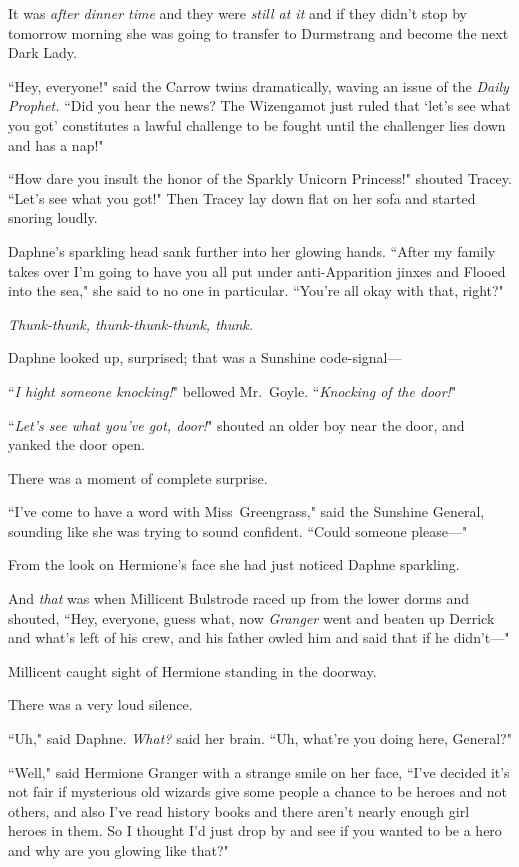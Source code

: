 It was \emph{after dinner time} and they were \emph{still at it} and if they didn't stop by tomorrow morning she was going to transfer to Durmstrang and become the next Dark Lady.

``Hey, everyone!" said the Carrow twins dramatically, waving an issue of the \emph{Daily Prophet.} ``Did you hear the news? The Wizengamot just ruled that `let's see what you got' constitutes a lawful challenge to be fought until the challenger lies down and has a nap!"

``How dare you insult the honor of the Sparkly Unicorn Princess!" shouted Tracey. ``Let's see what you got!" Then Tracey lay down flat on her sofa and started snoring loudly.

Daphne's sparkling head sank further into her glowing hands. ``After my family takes over I'm going to have you all put under anti-Apparition jinxes and Flooed into the sea," she said to no one in particular. ``You're all okay with that, right?"

\emph{Thunk-thunk, thunk-thunk-thunk, thunk.}

Daphne looked up, surprised; that was a Sunshine code-signal---

``\emph{I hight someone knocking!}" bellowed Mr.~Goyle. ``\emph{Knocking of the door!}"

``\emph{Let's see what you've got, door!}" shouted an older boy near the door, and yanked the door open.

There was a moment of complete surprise.

``I've come to have a word with Miss~Greengrass," said the Sunshine General, sounding like she was trying to sound confident. ``Could someone please---"

From the look on Hermione's face she had just noticed Daphne sparkling.

And \emph{that} was when Millicent Bulstrode raced up from the lower dorms and shouted, ``Hey, everyone, guess what, now \emph{Granger} went and beaten up Derrick and what's left of his crew, and his father owled him and said that if he didn't---"

Millicent caught sight of Hermione standing in the doorway.

There was a very loud silence.

``Uh," said Daphne. \emph{What?} said her brain. ``Uh, what're you doing here, General?"

``Well," said Hermione Granger with a strange smile on her face, ``I've decided it's not fair if mysterious old wizards give some people a chance to be heroes and not others, and also I've read history books and there aren't nearly enough girl heroes in them. So I thought I'd just drop by and see if you wanted to be a hero and why are you glowing like that?"

